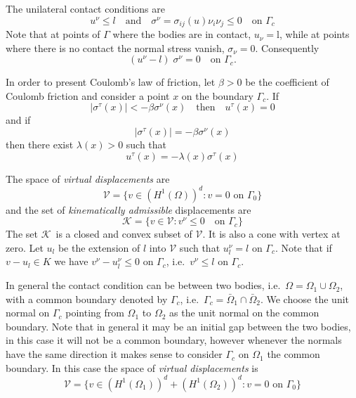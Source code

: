 \documentclass[12pt,a4paper]{article}
\numberwithin{equation}{section}
\numberwithin{table}{section}
\numberwithin{figure}{section}
\newcommand{\HenO}{H^1(\Omega)}
\newcommand{\HenOne}{H^1(\Omega_1)}
\newcommand{\HenTwo}{H^1(\Omega_2)}
\newcommand{\V}{\ensuremath{\mathcal{V}}}
\newcommand{\K}{\ensuremath{\mathcal{K}}}
\newcommand{\stress}[1][]{\ensuremath{\sigma_{#1}}}
\newcommand{\sigij}{\stress[ij]}
\providecommand{\abs}[1]{\lvert #1 \rvert}
\begin{document}
The unilateral contact conditions are
\begin{equation}
  \label{eq:contact}
  u^\nu \le l \quad\text{and}\quad \sigma^\nu = \sigij(u)\nu_i \nu_j \le 0
  \quad\text{on }\Gamma_c
\end{equation}
Note that at points of $\Gamma$ where the bodies are in contact, $u_\nu=$l, while at
points where there is no contact the normal stress vanish, $\sigma_\nu = 0$.
Consequently
\begin{equation}
  \label{eq:7}
  (u^\nu - l) \;\sigma^\nu = 0 \quad\text{on }\Gamma_c.
\end{equation}

In order to present Coulomb's law of friction, let $\beta>0$ be the coefficient of Coulomb
friction and consider a point $x$ on the boundary $\Gamma_c$.  If
\begin{equation}
  \label{eq:9}
  \abs{\sigma^\tau(x)} < -\beta \sigma^\nu(x) \quad\text{then}\quad
  u^\tau(x) = 0
\end{equation}
and if
\begin{equation}
  \label{eq:10}
  \abs{\sigma^\tau(x)} = -\beta \sigma^\nu(x)
\end{equation}
then there exist $\lambda(x)>0$ such that
\begin{equation}
  u^\tau(x) = -\lambda(x) \sigma^\tau(x)
\end{equation}

The space of \emph{virtual displacements} are
\begin{equation}
  \label{eq:VirtualDisplacementsUni}
  \V = \{v\in(\HenO)^d \colon v = 0 \text{ on }\Gamma_0 \}
\end{equation}
and the set of \emph{kinematically admissible} displacements are
\begin{equation}
  \label{eq:KinematicallyAdmisible}
  \K = \{v\in \V \colon v^\nu \le 0 \quad\text{on }\Gamma_c \}
\end{equation}
The set \K\ is a closed and convex subset of \V. It is also a cone
with vertex at zero.  Let $u_l$ be the extension of $l$ into $\V$ such
that $u_l^\nu = l$ on $\Gamma_c$.  Note that if $v-u_l\in K$ we have
$v^\nu-u_l^\nu \le 0$ on $\Gamma_c$, i.e.\ $v^\nu \le l$ on
$\Gamma_c$.

In general the contact condition can be between two bodies, i.e.\ $\Omega =
\Omega_1\cup\Omega_2$, with a common boundary denoted by $\Gamma_c$, i.e.\ $\Gamma_c =
\bar{\Omega}_1\cap\bar{\Omega}_2$.  We choose the unit normal on $\Gamma_c$ pointing from
$\Omega_1$ to $\Omega_2$ as the unit normal on the common boundary.  Note that in general
it may be an initial gap between the two bodies, in this case it will not be a common
boundary, however whenever the normals have the same direction it makes sense to consider
$\Gamma_c$ on $\Omega_1$ the common boundary.  In this case the space of \emph{virtual
  displacements} is 
\begin{equation}
  \label{eq:VirtualDisplacements}
  \V = \{v\in(\HenOne)^d+(\HenTwo)^d \colon v = 0 \text{ on }\Gamma_0 \}
\end{equation}
\end{document}
